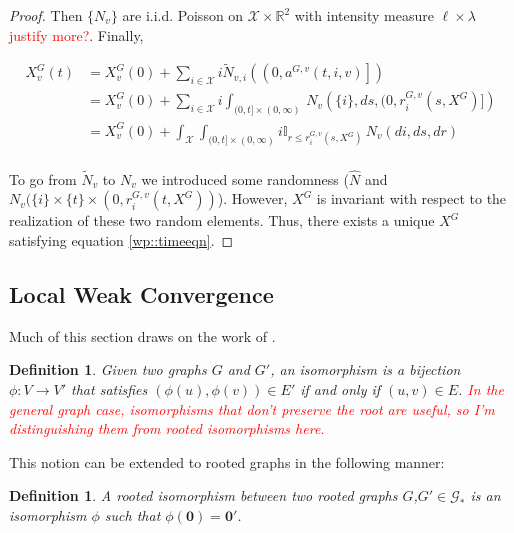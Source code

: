 \documentclass[12pt]{article}
\newcommand{\mb}{\mathbb}
\newcommand{\mc}{\mathcal}
\newcommand{\ra}{\rightarrow}
\newcommand{\tr}{\textcolor{red}}
\newcommand{\sta}{\mc{X}}							%
\renewcommand{\root}{\mathbf{0}}					%
\newcommand{\Xf}{X}									%
\newcommand{\poiss}{N}								%
\newcommand{\leb}{\lambda}							%
\newcommand{\Sm}{\ell}								%
\newcommand{\rate}{r}								%
\newcommand{\poissv}[1]{_{#1}}						%
\newcommand{\vind}[1]{_{#1}}						%
\newcommand{\tme}[1]{(#1)}							%
\newcommand{\gind}[1]{^{#1}}						%
\newcommand{\stpara}[1]{_{#1}}						%
\newcommand{\gvpara}[2]{^{#1,#2}}					%
\newcommand{\tmepro}[2]{(#1,#2)}					%
\newcommand{\Gs}{\mc{G}_\ast}						%
\newcommand{\compen}{a}								%
\newcommand{\alt}[1]{\tilde{#1}}					%
\newtheorem{defn}[thms]{Definition}
\begin{document}
\begin{proof}
Then \(\{\poiss\poissv{v}\}\) are i.i.d. Poisson on \(\sta\times\mb{R}^2\) with intensity measure \(\Sm\times\leb\) \tr{justify more?}. Finally,

\begin{align*}
\Xf\gind{G}\vind{v}\tme{t} &= \Xf\gind{G}\vind{v}\tme{0} + \sum_{i \in \sta} i\alt{\poiss}\poissv{v,i}\left(\left(0,\compen\gvpara{G}{v}(t,i,v)\right]\right)\\
&=\Xf\gind{G}\vind{v}\tme{0} + \sum_{i \in \sta} i\int_{(0,t]\times (0,\infty)}\,\poiss\poissv{v}\left(\{i\}, ds, (0,\rate\gvpara{G}{v}\stpara{i}\tmepro{s}{\Xf\gind{G}}]\right)\\
&=\Xf\gind{G}\vind{v}\tme{0} + \int_{\sta} \int_{(0,t]\times (0,\infty)}i\mb{I}_{r\leq \rate\gvpara{G}{v}\stpara{i}\tmepro{s}{\Xf\gind{G}}}\,\poiss\poissv{v}\left(di, ds, dr\right)\\
\end{align*}

To go from \(\alt{\poiss}\poissv{v}\) to \(\poiss\poissv{v}\) we introduced some randomness (\(\hat{\poiss}\) and \(\poiss\poissv{v}(\{i\}\times\{t\}\times(0,\rate\gvpara{G}{v}\stpara{i}\tmepro{t}{\Xf\gind{G}})\)). However, \(\Xf\gind{G}\) is invariant with respect to the realization of these two random elements. Thus, there exists a unique \(\Xf\gind{G}\) satisfying equation \eqref{wp::timeeqn}.
\end{proof}

\subsection{Local Weak Convergence}
\label{awl::lwc}

Much of this section draws on the work of \cite{LacRamWu19}.

\begin{defn}
Given two graphs \(G\) and \(G'\), an isomorphism is a bijection \(\phi: V \ra V'\) that satisfies \((\phi(u),\phi(v)) \in E'\) if and only if \((u,v) \in E\). \tr{In the general graph case, isomorphisms that don't preserve the root are useful, so I'm distinguishing them from rooted isomorphisms here.}
\label{lwc::iso}
\end{defn}

This notion can be extended to rooted graphs in the following manner:

\begin{defn}
A rooted isomorphism between two rooted graphs \(G\),\(G' \in \Gs\) is an isomorphism \(\phi\) such that \(\phi(\root) = \root'\).
\label{lwc::riso}
\end{defn}
\end{document}
